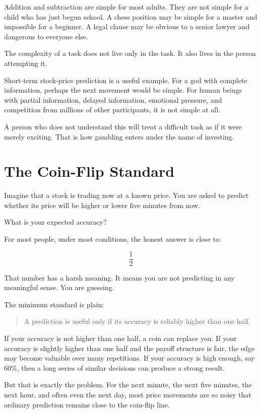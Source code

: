 Addition and subtraction are simple for most adults. They are not simple for a child who has just begun school. A chess position may be simple for a master and impossible for a beginner. A legal clause may be obvious to a senior lawyer and dangerous to everyone else.

The complexity of a task does not live only in the task. It also lives in the person attempting it.

Short-term stock-price prediction is a useful example. For a god with complete information, perhaps the next movement would be simple. For human beings with partial information, delayed information, emotional pressure, and competition from millions of other participants, it is not simple at all.

A person who does not understand this will treat a difficult task as if it were merely exciting. That is how gambling enters under the name of investing.

\section*{The Coin-Flip Standard}

Imagine that a stock is trading now at a known price. You are asked to predict whether its price will be higher or lower five minutes from now.

What is your expected accuracy?

For most people, under most conditions, the honest answer is close to:

\[
\frac{1}{2}
\]

That number has a harsh meaning. It means you are not predicting in any meaningful sense. You are guessing.

The minimum standard is plain:

\begin{quote}
A prediction is useful only if its accuracy is reliably higher than one half.
\end{quote}

If your accuracy is not higher than one half, a coin can replace you. If your accuracy is slightly higher than one half and the payoff structure is fair, the edge may become valuable over many repetitions. If your accuracy is high enough, say 60\%, then a long series of similar decisions can produce a strong result.

But that is exactly the problem. For the next minute, the next five minutes, the next hour, and often even the next day, most price movements are so noisy that ordinary prediction remains close to the coin-flip line.

